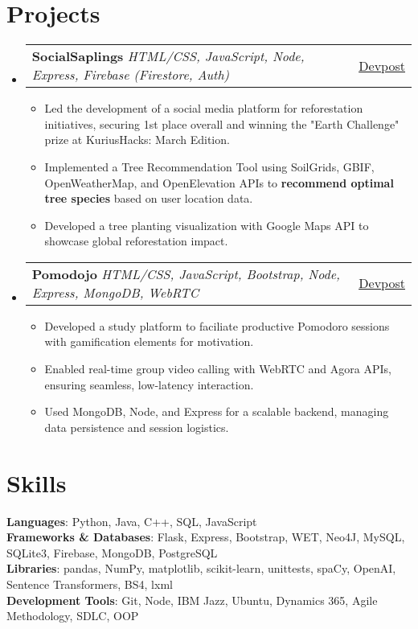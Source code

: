 \documentclass[letterpaper,11pt]{article}
\makeatletter
\newcommand{\resumeItem}[1]{
  \item\small{
    {#1 \vspace{-2pt}}
  }
}
\newcommand{\resumeSubheading}[3]{
    \item
    \begin{tabular*}{0.97\textwidth}[t]{l@{\extracolsep{\fill}}r}
      \textbf{#1} \textbar \textit{ #2} & #3 \\
    \end{tabular*}\vspace{-4.5pt}
}
\newcommand{\resumeSubHeadingListStart}{\begin{itemize}[leftmargin=0.15in, label={}]}
\newcommand{\resumeSubHeadingListEnd}{\end{itemize}}
\newcommand{\resumeItemListStart}{\begin{itemize}}
\newcommand{\resumeItemListEnd}{\end{itemize}\vspace{-5pt}}
\makeatother
\begin{document}
\section{\textbf{\Large Projects}}
    \resumeSubHeadingListStart

        \resumeSubheading{SocialSaplings}{HTML/CSS, JavaScript, Node, Express, Firebase (Firestore, Auth)}{\href{https://devpost.com/software/socialsaplings}{\underline{Devpost}}}
            \resumeItemListStart
                \resumeItem{Led the development of a social media platform for reforestation initiatives, securing 1st place overall and winning the "Earth Challenge" prize at KuriusHacks: March Edition.}
                \resumeItem{Implemented a Tree Recommendation Tool using SoilGrids, GBIF, OpenWeatherMap, and OpenElevation APIs to \textbf{recommend optimal tree species} based on user location data.}
                \resumeItem{Developed a tree planting visualization with Google Maps API to showcase global reforestation impact.}
            \resumeItemListEnd

        \resumeSubheading{Pomodojo}{HTML/CSS, JavaScript, Bootstrap, Node, Express, MongoDB, WebRTC}{\href{https://devpost.com/software/pomodorm}{\underline{Devpost}}}
            \resumeItemListStart
                \resumeItem{Developed a study platform to faciliate productive Pomodoro sessions with gamification elements for motivation.}
                \resumeItem{Enabled real-time group video calling with WebRTC and Agora APIs, ensuring seamless, low-latency interaction.}
                \resumeItem{Used MongoDB, Node, and Express for a scalable backend, managing data persistence and session logistics.}
            \resumeItemListEnd

    \resumeSubHeadingListEnd

\section{\textbf{\Large Skills}}
  \begin{itemize}[leftmargin=0.15in, label={}]
    \small{
    \item{
    \textbf{Languages}{: Python, Java, C++, SQL, JavaScript} \\[0.25em]
    \textbf{Frameworks \& Databases}{: Flask, Express, Bootstrap, WET, Neo4J, MySQL, SQLite3, Firebase, MongoDB, PostgreSQL} \\[0.25em]
    \textbf{Libraries}{: pandas, NumPy, matplotlib, scikit-learn, unittests, spaCy, OpenAI, Sentence Transformers, BS4, lxml} \\[0.25em]
    \textbf{Development Tools}{: Git, Node, IBM Jazz, Ubuntu, Dynamics 365, Agile Methodology, SDLC, OOP} \\
    }}
  \end{itemize}

\end{document}
